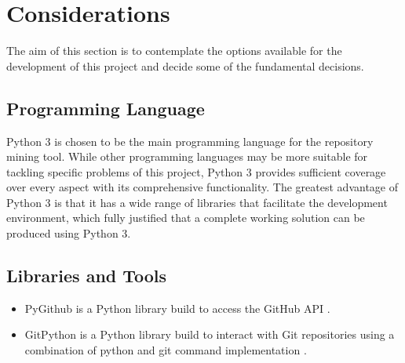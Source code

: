 \documentclass[12pt, a4paper]{report}
\begin{document}
{\section{Considerations}
The aim of this section is to contemplate the options available for the development of this project
and decide some of the fundamental decisions.

\subsection{Programming Language}
Python 3 \cite{python} is chosen to be the main programming language for the repository mining tool.
While other programming languages may be more suitable for tackling specific problems of this
project, Python 3 provides sufficient coverage over every aspect with its comprehensive
functionality. The greatest advantage of Python 3 is that it has a wide range of libraries that
facilitate the development environment, which fully justified that a complete working solution can
be produced using Python 3.

\subsection{Libraries and Tools}
\begin{itemize}
	\item PyGithub is a Python library build to access the GitHub API \cite{pygithub}.
	\item GitPython is a Python library build to interact with Git repositories using a combination of
	python and git command implementation \cite{gitpython}.
\end{itemize}




}
\end{document}
